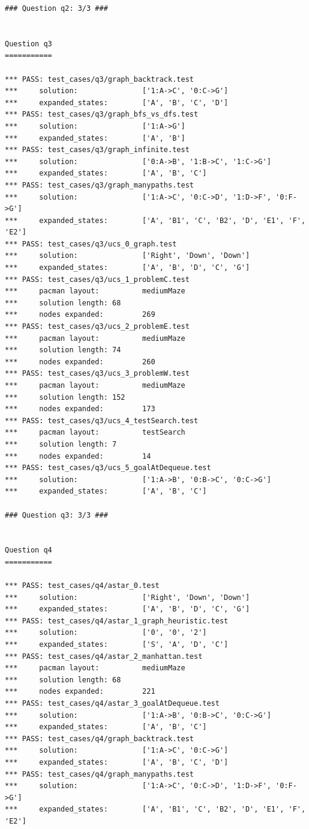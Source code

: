 \documentclass{report}
\begin{document}
\begin{lstlisting}
### Question q2: 3/3 ###


Question q3
===========

*** PASS: test_cases/q3/graph_backtrack.test
***     solution:               ['1:A->C', '0:C->G']
***     expanded_states:        ['A', 'B', 'C', 'D']
*** PASS: test_cases/q3/graph_bfs_vs_dfs.test
***     solution:               ['1:A->G']
***     expanded_states:        ['A', 'B']
*** PASS: test_cases/q3/graph_infinite.test
***     solution:               ['0:A->B', '1:B->C', '1:C->G']
***     expanded_states:        ['A', 'B', 'C']
*** PASS: test_cases/q3/graph_manypaths.test
***     solution:               ['1:A->C', '0:C->D', '1:D->F', '0:F->G']
***     expanded_states:        ['A', 'B1', 'C', 'B2', 'D', 'E1', 'F', 'E2']
*** PASS: test_cases/q3/ucs_0_graph.test
***     solution:               ['Right', 'Down', 'Down']
***     expanded_states:        ['A', 'B', 'D', 'C', 'G']
*** PASS: test_cases/q3/ucs_1_problemC.test
***     pacman layout:          mediumMaze
***     solution length: 68
***     nodes expanded:         269
*** PASS: test_cases/q3/ucs_2_problemE.test
***     pacman layout:          mediumMaze
***     solution length: 74
***     nodes expanded:         260
*** PASS: test_cases/q3/ucs_3_problemW.test
***     pacman layout:          mediumMaze
***     solution length: 152
***     nodes expanded:         173
*** PASS: test_cases/q3/ucs_4_testSearch.test
***     pacman layout:          testSearch
***     solution length: 7
***     nodes expanded:         14
*** PASS: test_cases/q3/ucs_5_goalAtDequeue.test
***     solution:               ['1:A->B', '0:B->C', '0:C->G']
***     expanded_states:        ['A', 'B', 'C']

### Question q3: 3/3 ###


Question q4
===========

*** PASS: test_cases/q4/astar_0.test
***     solution:               ['Right', 'Down', 'Down']
***     expanded_states:        ['A', 'B', 'D', 'C', 'G']
*** PASS: test_cases/q4/astar_1_graph_heuristic.test
***     solution:               ['0', '0', '2']
***     expanded_states:        ['S', 'A', 'D', 'C']
*** PASS: test_cases/q4/astar_2_manhattan.test
***     pacman layout:          mediumMaze
***     solution length: 68
***     nodes expanded:         221
*** PASS: test_cases/q4/astar_3_goalAtDequeue.test
***     solution:               ['1:A->B', '0:B->C', '0:C->G']
***     expanded_states:        ['A', 'B', 'C']
*** PASS: test_cases/q4/graph_backtrack.test
***     solution:               ['1:A->C', '0:C->G']
***     expanded_states:        ['A', 'B', 'C', 'D']
*** PASS: test_cases/q4/graph_manypaths.test
***     solution:               ['1:A->C', '0:C->D', '1:D->F', '0:F->G']
***     expanded_states:        ['A', 'B1', 'C', 'B2', 'D', 'E1', 'F', 'E2']


\end{lstlisting}
\end{document}
